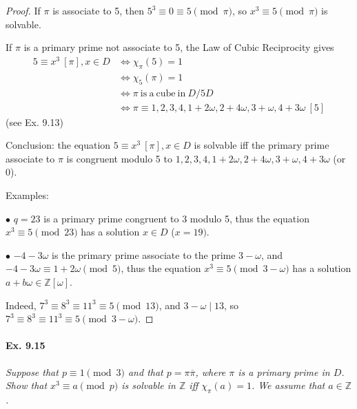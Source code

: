 \documentclass[11pt,a4paper]{article}
\newcommand{\Z}{\mathbb{Z}}
\begin{document}
\begin{proof}
If $\pi$ is associate to 5, then $5^3 \equiv 0 \equiv 5 \pmod \pi$, so $x^3 \equiv 5 \pmod \pi$ is solvable.

If $\pi$ is a primary prime not associate to 5, the Law of Cubic Reciprocity gives
\begin{align*}
5\equiv x^3 \ [\pi], x \in D &\iff \chi_\pi(5)=1\\
&\iff \chi_5(\pi)=1\\
&\iff  \pi \ \mathrm{ is\ a\ cube\ in\  } D/5D\\
&\iff \pi \equiv1,2,3,4,1+2\omega,2+4\omega,3+\omega,4+3\omega \ [5]
\end{align*}
(see Ex. 9.13)

\bigskip

Conclusion: the equation $5\equiv x^3 \ [\pi], x \in D $ is solvable iff the primary prime associate to $\pi$ is congruent modulo 5 to $1,2,3,4,1+2\omega,2+4\omega,3+\omega,4+3\omega$ (or 0).

Examples: 

$\bullet$ $q=23$ is a primary prime congruent to 3 modulo 5, thus the equation $x^3 \equiv 5\pmod{23}$ has a solution $x  \in D$ ($x = 19)$.

$\bullet$ $-4 - 3 \omega$ is the primary prime associate to the prime $3- \omega$, and $-4 - 3 \omega \equiv 1 + 2 \omega \pmod 5$, thus the equation $x^3 \equiv 5 \pmod {3-\omega}$ has a solution $a + b \omega \in \Z[\omega]$.

Indeed, $7^3 \equiv 8^3 \equiv 11^3 \equiv 5 \pmod {13}$, and $3 - \omega \mid 13$, so $7^3 \equiv 8^3 \equiv 11^3 \equiv 5 \pmod{ 3 - \omega}$.
\end{proof}

\paragraph{Ex. 9.15}

{\it Suppose that $p \equiv 1 \pmod 3$ and that $p = \pi \overline{\pi}$, where $\pi$ is a primary prime in $D$. Show that $x^3 \equiv a \pmod p$ is solvable in $\Z$ iff $\chi_{\pi}(a) = 1$. We assume that $a \in \Z$.
}
\end{document}
